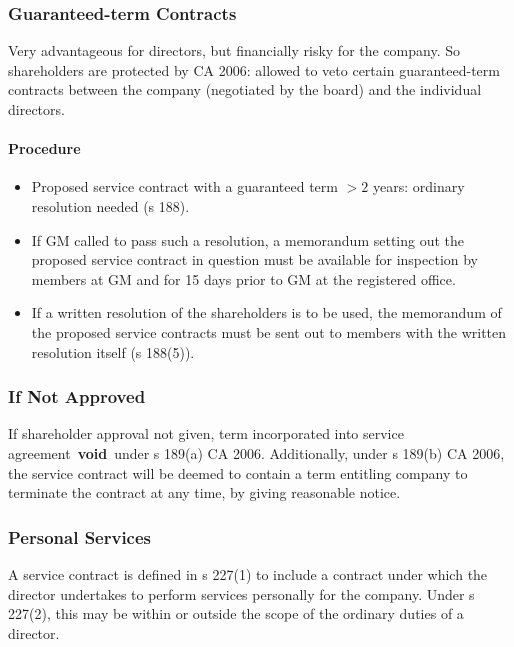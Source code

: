 \documentclass[
]{article}
\providecommand{\tightlist}{%
  \setlength{\itemsep}{0pt}\setlength{\parskip}{0pt}}
\begin{document}
\hypertarget{guaranteed-term-contracts}{%
\subsubsection{Guaranteed-term
Contracts}\label{guaranteed-term-contracts}}

Very advantageous for directors, but financially risky for the company.
So shareholders are protected by CA 2006: allowed to veto certain
guaranteed-term contracts between the company (negotiated by the board)
and the individual directors.

\hypertarget{procedure-1}{%
\paragraph{Procedure}\label{procedure-1}}

\begin{itemize}
\tightlist
\item
  Proposed service contract with a guaranteed term \(>2\) years:
  ordinary resolution needed (s 188).
\item
  If GM called to pass such a resolution, a memorandum setting out the
  proposed service contract in question must be available for inspection
  by members at GM and for 15 days prior to GM at the registered office.
\item
  If a written resolution of the shareholders is to be used, the
  memorandum of the proposed service contracts must be sent out to
  members with the written resolution itself (s 188(5)).
\end{itemize}

\hypertarget{if-not-approved}{%
\subsubsection{If Not Approved}\label{if-not-approved}}

If shareholder approval not given, term incorporated into service
agreement~\textbf{void}~under s 189(a) CA 2006. Additionally, under s
189(b) CA 2006, the service contract will be deemed to contain a term
entitling company to terminate the contract at any time, by giving
reasonable notice.

\hypertarget{personal-services}{%
\subsubsection{Personal Services}\label{personal-services}}

A service contract is defined in s 227(1) to include a contract under
which the director undertakes to perform services personally for the
company. Under s 227(2), this may be within or outside the scope of the
ordinary duties of a director.
\end{document}
